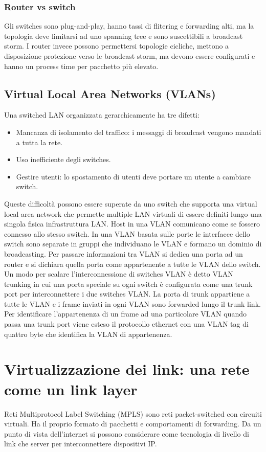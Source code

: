 \subsubsection{Router vs switch}
Gli switches sono plug-and-play, hanno tassi di flitering e forwarding alti, ma la topologia deve limitarsi ad uno spanning tree e sono suscettibili a broadcast storm. I router invece possono permettersi topologie
cicliche, mettono a disposizione protezione verso le broadcast storm, ma devono essere configurati e hanno un process time per pacchetto pi\`u elevato.
\subsection{Virtual Local Area Networks (VLANs)}
Una switched LAN organizzata gerarchicamente ha tre difetti:
\begin{itemize}
\item Mancanza di isolamento del traffico: i messaggi di broadcast vengono mandati a tutta la rete. 
\item Uso inefficiente degli switches. 
\item Gestire utenti: lo spostamento di utenti deve portare un utente a cambiare switch.
\end{itemize}
Queste difficolt\`a possono essere superate da uno switch che supporta una virtual local area network che permette multiple LAN virtuali di essere definiti lungo una singola fisica infrastruttura LAN.  Host in
una VLAN comunicano come se fossero connesso allo stesso switch. In una VLAN basata sulle porte le interfacce dello switch sono separate in gruppi che individuano le VLAN e formano un dominio di 
broadcasting. Per passare informazioni tra VLAN si dedica una porta ad un router e si dichiara quella porta come appartenente a tutte le VLAN dello switch. Un modo per scalare l'interconnessione di switches
VLAN \`e detto VLAN trunking in cui una porta speciale su ogni switch \`e configurata come una trunk port per interconnettere i due switches VLAN. La porta di trunk appartiene a tutte le VLAN e i frame inviati
in ogni VLAN sono forwarded lungo il trunk link. Per identificare l'appartenenza di un frame ad una particolare VLAN quando passa una trunk port viene esteso il protocollo ethernet con una VLAN tag di 
quattro byte che identifica la VLAN di appartenenza. 
\section{Virtualizzazione dei link: una rete come un link layer}
Reti Multiprotocol Label Switching (MPLS) sono reti packet-switched con circuiti virtuali. Ha il proprio formato di pacchetti e comportamenti di forwarding. Da un punto di vista dell'internet si possono
considerare come tecnologia di livello di link che server per interconnettere dispositivi IP. 
